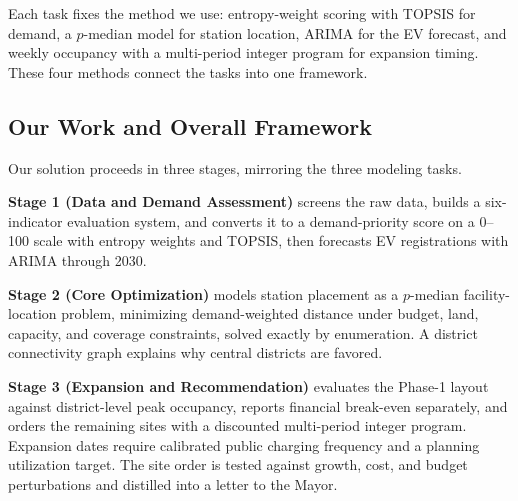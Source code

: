 \documentclass[12pt]{article}
\begin{document}
Each task fixes the method we use: entropy-weight scoring with TOPSIS for demand, a
$p$-median model for station location, ARIMA for the EV forecast, and weekly occupancy with
a multi-period integer program for expansion timing. These four methods connect the tasks
into one framework.

\subsection{Our Work and Overall Framework}

Our solution proceeds in three stages, mirroring the three modeling tasks.

\textbf{Stage 1 (Data and Demand Assessment)} screens the raw data, builds a six-indicator
evaluation system, and converts it to a demand-priority score on a 0--100 scale with
entropy weights and TOPSIS, then forecasts EV registrations with ARIMA through 2030.

\textbf{Stage 2 (Core Optimization)} models station placement as a $p$-median
facility-location problem, minimizing demand-weighted distance under budget, land, capacity,
and coverage constraints, solved exactly by enumeration. A district connectivity graph
explains why central districts are favored.

\textbf{Stage 3 (Expansion and Recommendation)} evaluates the Phase-1 layout against
district-level peak occupancy, reports financial break-even separately, and orders the
remaining sites with a discounted multi-period integer program. Expansion dates require
calibrated public charging frequency and a planning utilization target. The site order
is tested against growth, cost, and budget
perturbations and distilled into a letter to the Mayor.
\end{document}
